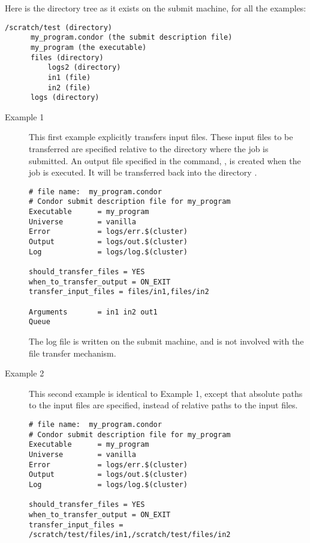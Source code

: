 Here is the directory tree as it exists on the submit machine,
for all the examples:
\begin{verbatim}
/scratch/test (directory)
      my_program.condor (the submit description file)
      my_program (the executable)
      files (directory)
          logs2 (directory)
          in1 (file)
          in2 (file)
      logs (directory)
\end{verbatim}

\begin{description}
\item[Example 1]

This first example explicitly transfers input files.
These input files to be transferred
are specified relative to the directory where the job is submitted.
An output file specified in the  command, ,
is created when the job is executed.
It will be transferred back into the directory .

\footnotesize
\begin{verbatim}
# file name:  my_program.condor
# Condor submit description file for my_program
Executable      = my_program
Universe        = vanilla
Error           = logs/err.$(cluster)
Output          = logs/out.$(cluster)
Log             = logs/log.$(cluster)

should_transfer_files = YES
when_to_transfer_output = ON_EXIT
transfer_input_files = files/in1,files/in2

Arguments       = in1 in2 out1
Queue
\end{verbatim}
\normalsize

The log file is written on the submit machine, and is not involved
with the file transfer mechanism.
\item[Example 2]

This second example is identical to Example 1,
except that absolute paths to the input files are specified,
instead of relative paths to the input files.

\footnotesize
\begin{verbatim}
# file name:  my_program.condor
# Condor submit description file for my_program
Executable      = my_program
Universe        = vanilla
Error           = logs/err.$(cluster)
Output          = logs/out.$(cluster)
Log             = logs/log.$(cluster)

should_transfer_files = YES
when_to_transfer_output = ON_EXIT
transfer_input_files = /scratch/test/files/in1,/scratch/test/files/in2


\end{verbatim}
\end{description}
